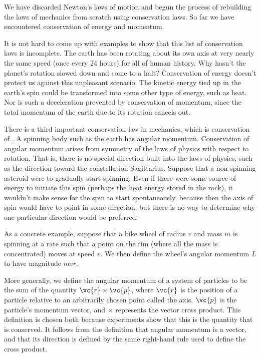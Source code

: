 We have discarded Newton's laws of motion and begun the process of
rebuilding the laws of mechanics from scratch using conservation laws.
So far we have encountered conservation of energy and momentum.

It is not hard to come up with examples to show that this list of
conservation laws is incomplete. The earth has been
rotating about its own axis
at very nearly the same speed (once every 24 hours) for all of human history.
Why hasn't the planet's rotation slowed down and come to a halt? Conservation of energy doesn't
protect us against this unpleasant scenario. 
The kinetic energy tied up in the earth's spin could be transformed into some
other type of energy, such as heat. Nor is such a deceleration prevented by
conservation of momentum, since the total momentum of the earth due to its
rotation cancels out.

There is a third important conservation law in mechanics, which is conservation of
. 
A spinning body such as the earth has angular momentum. Conservation of angular
momentum arises from symmetry of the laws of physics with respect to rotation.
That is, there is no special direction built into the laws of physics, such as the
direction toward the constellation Sagittarius. Suppose that a non-spinning asteroid
were to gradually start spinning. Even if there were some source of energy to initiate
this spin (perhaps the heat energy stored in the rock), it wouldn't make sense for
the spin to start spontaneously, because then the axis of spin would have to point
in some direction, but there is no way to determine why one particular direction
would be preferred.

As a concrete example, suppose that a bike wheel of radius $r$ and mass $m$ is
spinning at a rate such that a point on the rim (where all the mass is concentrated)
moves at speed $v$. We then define the wheel's angular momentum $L$ to have magnitude
$mvr$.

More generally, we define the angular momentum of a system of particles to
be the sum of the quantity $\vc{r}\times\vc{p}$, where $\vc{r}$ is the position of
a particle relative to an arbitrarily chosen point called the axis, $\vc{p}$ is the
particle's momentum vector, and $\times$ represents the vector cross product. This
definition is chosen both because experiments show that this is the quantity that is
conserved. It
follows from the definition that angular momentum is a vector, and that its direction
is defined by the same right-hand rule used to define the cross product.
